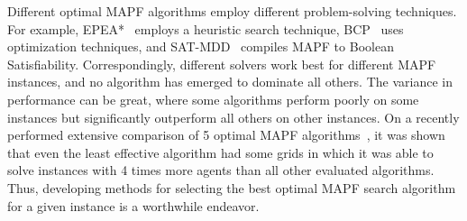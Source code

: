 \documentclass[letterpaper]{article} %
\newcommand{\shortcite}[1]{\cite{#1}}
\begin{document}
Different optimal MAPF algorithms employ different problem-solving techniques. For example, EPEA*~\cite{goldenberg2014enhanced} employs a heuristic search technique, BCP~\cite{lam2022branch} uses optimization techniques, and SAT-MDD~\cite{surynek2016efficient} compiles MAPF to Boolean Satisfiability. 
Correspondingly, different solvers work best for different MAPF instances, and no algorithm has emerged to dominate all others. 
The variance in performance can be great, where some algorithms perform poorly on some instances but significantly outperform all others on other instances. 
On a recently performed extensive comparison of 5 optimal MAPF algorithms~\cite{kaduri2021experimental}, it was shown that even the least effective algorithm had some grids in which it was able to solve instances with 4 times more agents than all other evaluated algorithms. %
Thus, developing methods for selecting the best optimal MAPF search algorithm for a given instance is a worthwhile endeavor. %


\end{document}
